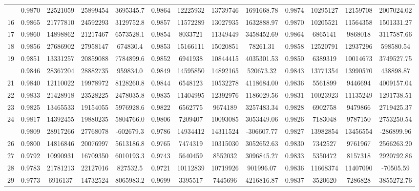\documentclass[
  12pt,
]{article}
\begin{document}
\begin{longtable}[t]{lcccccccccccc}
\addlinespace
15 & 0.9870 & 22521059 & 25899454 & 3695345.7 & 0.9864 & 12225932 & 13739746 & 1691668.78 & 0.9874 & 10295127 & 12159708 & 2007024.02\\
16 & 0.9865 & 21777810 & 24592293 & 3129752.8 & 0.9857 & 11572289 & 13027935 & 1632888.97 & 0.9870 & 10205521 & 11564358 & 1501331.27\\
17 & 0.9860 & 14898862 & 21217467 & 6573528.1 & 0.9854 & 8033721 & 11349449 & 3458452.69 & 0.9864 & 6865141 & 9868018 & 3117587.66\\
18 & 0.9856 & 27686902 & 27958147 & 674830.4 & 0.9853 & 15166111 & 15020851 & 78261.31 & 0.9858 & 12520791 & 12937296 & 598580.54\\
19 & 0.9851 & 13331257 & 20859088 & 7784899.6 & 0.9852 & 6941938 & 10844415 & 4035301.53 & 0.9850 & 6389319 & 10014673 & 3749527.75\\
\addlinespace
20 & 0.9846 & 28367204 & 28882735 & 959834.0 & 0.9849 & 14595850 & 14892165 & 520673.32 & 0.9843 & 13771354 & 13990570 & 438898.87\\
21 & 0.9840 & 12110022 & 19978972 & 8128260.8 & 0.9844 & 6548123 & 10532278 & 4118684.00 & 0.9836 & 5561899 & 9446694 & 4009157.04\\
22 & 0.9833 & 21428918 & 23528225 & 2478035.8 & 0.9835 & 11404995 & 12392976 & 1186029.56 & 0.9831 & 10023923 & 11135249 & 1291738.51\\
23 & 0.9825 & 13465533 & 19154055 & 5976928.6 & 0.9822 & 6562775 & 9674189 & 3257483.34 & 0.9828 & 6902758 & 9479866 & 2719425.37\\
24 & 0.9817 & 14392455 & 19880235 & 5804766.0 & 0.9806 & 7209407 & 10093085 & 3053449.06 & 0.9826 & 7183048 & 9787150 & 2753250.54\\
\addlinespace
25 & 0.9809 & 28917266 & 27768078 & -602679.3 & 0.9786 & 14934412 & 14311524 & -306607.77 & 0.9827 & 13982854 & 13456554 & -286899.96\\
26 & 0.9800 & 14816846 & 20076997 & 5613186.8 & 0.9765 & 7474319 & 10315030 & 3052652.63 & 0.9830 & 7342527 & 9761967 & 2566263.20\\
27 & 0.9792 & 10990931 & 16709350 & 6010193.3 & 0.9743 & 5640459 & 8552032 & 3096845.27 & 0.9833 & 5350472 & 8157318 & 2920792.86\\
28 & 0.9783 & 21781213 & 22127016 & 827532.5 & 0.9721 & 10112839 & 10719926 & 901996.07 & 0.9836 & 11668374 & 11407090 & -70505.59\\
29 & 0.9773 & 6916137 & 14732524 & 8065983.2 & 0.9699 & 3395517 & 7445696 & 4216816.87 & 0.9837 & 3520620 & 7286828 & 3855272.76\\

\end{longtable}
\end{document}
